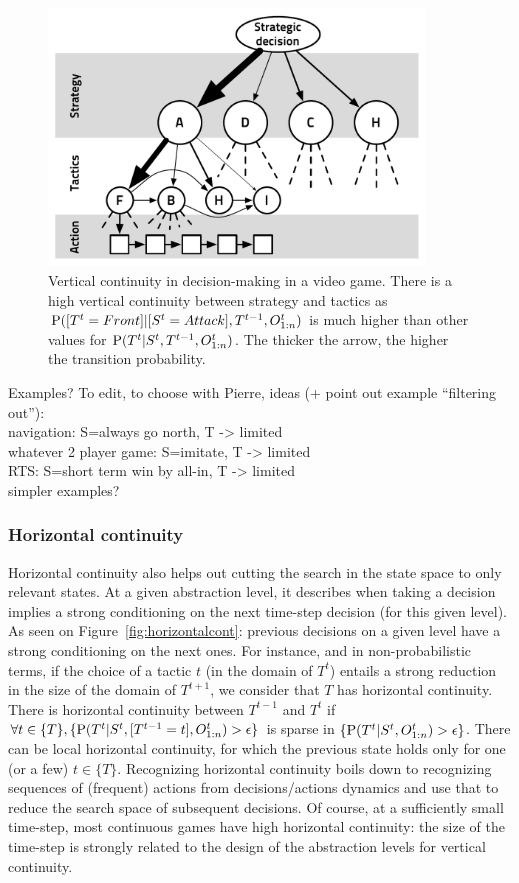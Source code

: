 \begin{figure}
\begin{center}
\includegraphics[width=10cm]{images/vertical_cont_abstract_decision_hierarchy3.pdf}
\end{center}
\caption{Vertical continuity in decision-making in a video game. There is a high vertical continuity between strategy and tactics as $\mathrm{P}([T^t=Front]|[S^t=Attack], T^{t-1}, O_{1:n}^t)$ is much higher than other values for $\mathrm{P}(T^t|S^t,T^{t-1},O_{1:n}^t)$. The thicker the arrow, the higher the transition probability.}
\label{fig:verticalcont}
\end{figure}

Examples? To edit, to choose with Pierre, ideas (+ point out example ``filtering out''):\\
navigation: S=always go north, T -> limited\\
whatever 2 player game: S=imitate, T -> limited\\
RTS: S=short term win by all-in, T -> limited\\
simpler examples?


\subsubsection{Horizontal continuity}
Horizontal continuity also helps out cutting the search in the state space to only relevant states. At a given abstraction level, it describes when taking a decision implies a strong conditioning on the next time-step decision (for this given level). As seen on Figure~\ref{fig:horizontalcont}: previous decisions on a given level have a strong conditioning on the next ones. For instance, and in non-probabilistic terms, if the choice of a tactic $t$ (in the domain of $T^t$) entails a strong reduction in the size of the domain of $T^{t+1}$, we consider that $T$ has horizontal continuity. There is horizontal continuity between $T^{t-1}$ and $T^t$ if $\forall t \in \{T\}, \{\mathrm{P}(T^t|S^t,[T^{t-1}=t],O_{1:n}^t) > \epsilon\}$ is sparse in $\{\mathrm{P}(T^t|S^t,O_{1:n}^t) > \epsilon\}$. There can be local horizontal continuity, for which the previous state holds only for one (or a few) $t \in \{T\}$. Recognizing horizontal continuity boils down to recognizing sequences of (frequent) actions from decisions/actions dynamics and use that to reduce the search space of subsequent decisions. Of course, at a sufficiently small time-step, most continuous games have high horizontal continuity: the size of the time-step is strongly related to the design of the abstraction levels for vertical continuity.

